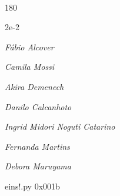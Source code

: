 \documentclass[12pt]{article}
\begin{document}
	\hfill	  	  


\pagebreak			

	\ 
	\vfill
	\begin{turn}{180}	
		\begin{minipage}{\textwidth}
		  	\ttfamily %
			\centering
			{\Huge 2e-2}
		  
			\hfill
		  
			

\textit{\small Fábio Alcover}

\textit{\small Camila Mossi}

\textit{\small Akira Demenech}

\textit{\small Danilo Calcanhoto}

\textit{\small Ingrid Midori Noguti Catarino}

\textit{\small Fernanda Martins}

\textit{\small Debora Maruyama}

\bigskip

eins!.py
0x001b


		\end{minipage}	
	\end{turn}
	\vfill
	\

\pagebreak
\end{document}
